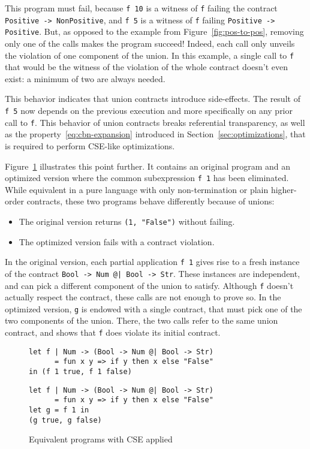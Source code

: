 \documentclass[sigplan,10pt]{acmart}
\newcommand{\nickel}[1]{\lstinline[language=nickel]{#1}}
\begin{document}
This program must fail, because \nickel{f 10} is a witness of \nickel{f} failing
the contract \nickel{Positive -> NonPositive}, and \nickel{f 5} is a witness of
\nickel{f} failing \nickel{Positive -> Positive}.  But, as opposed to the
example from Figure~\ref{fig:pos-to-pos}, removing only one of the calls makes the
program succeed! Indeed, each call only unveils the violation of one component
of the union. In this example, a single call to \nickel{f} that would be the
witness of the violation of the whole contract doesn't even exist: a minimum of
two are always needed.

This behavior indicates that union contracts introduce side-effects. The result
of \nickel{f 5} now depends on the previous execution and more specifically on
any prior call to \nickel{f}. This behavior of union contracts breaks
referential transparency, as well as the property~\ref{eq:cbn-expansion}
introduced in Section~\ref{sec:optimizations}, that is required to perform
CSE-like optimizations.

Figure~\ref{fig:optimized-programs} illustrates this point further. It contains
an original program and an optimized version where the common subexpression
\nickel{f 1} has been eliminated. While equivalent in a pure language with only
non-termination or plain higher-order contracts, these two programs behave
differently because of unions:

\begin{itemize}
    \item The original version returns \nickel{(1, "False")} without failing.
    \item The optimized version fails with a contract violation.
\end{itemize}

In the original version, each partial application \nickel{f 1} gives rise to a
fresh instance of the contract \nickel{Bool -> Num @| Bool -> Str}. These
instances are independent, and can pick a different component of the union to
satisfy. Although \nickel{f} doesn't actually respect the contract, these calls
are not enough to prove so. In the optimized version, \nickel{g} is endowed with
a single contract, that must pick one of the two components of the union. There,
the two calls refer to the same union contract, and shows that \nickel{f} does
violate its initial contract.

\begin{figure}[h]
\begin{lstlisting}[language=nickel, title=Original]
let f | Num -> (Bool -> Num @| Bool -> Str)
      = fun x y => if y then x else "False"
in (f 1 true, f 1 false)
\end{lstlisting}
\begin{lstlisting}[language=nickel, title=Optimized]
let f | Num -> (Bool -> Num @| Bool -> Str)
      = fun x y => if y then x else "False"
let g = f 1 in
(g true, g false)
\end{lstlisting}
\caption{Equivalent programs with CSE applied}
\label{fig:optimized-programs}
\end{figure}
\end{document}
